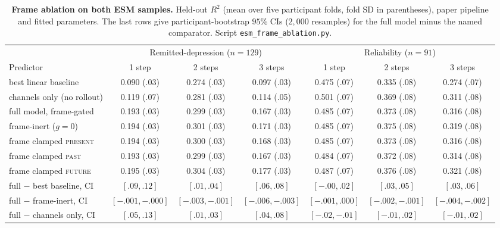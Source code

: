 \documentclass[11pt,a4paper]{article}
\begin{document}
\begin{table}[htbp]
\centering\small
\caption{\textbf{Frame ablation on both ESM samples.} Held-out $R^2$ (mean over five
participant folds, fold SD in parentheses), paper pipeline and fitted parameters. The
last rows give participant-bootstrap $95\%$ CIs ($2{,}000$ resamples) for the full
model minus the named comparator. Script \texttt{esm\_frame\_ablation.py}.}
\label{tab:frameablation}
\begin{tabular}{lcccccc}
\toprule
& \multicolumn{3}{c}{Remitted-depression ($n{=}129$)} & \multicolumn{3}{c}{Reliability ($n{=}91$)} \\
Predictor & 1 step & 2 steps & 3 steps & 1 step & 2 steps & 3 steps \\
\midrule
best linear baseline & 0.090 (.03) & 0.274 (.03) & 0.097 (.03) & 0.475 (.07) & 0.335 (.08) & 0.274 (.07) \\
channels only (no rollout) & 0.119 (.07) & 0.281 (.03) & 0.114 (.05) & 0.501 (.07) & 0.369 (.08) & 0.311 (.08) \\
full model, frame-gated & 0.193 (.03) & 0.299 (.03) & 0.167 (.03) & 0.485 (.07) & 0.373 (.08) & 0.316 (.08) \\
frame-inert ($g=0$) & 0.194 (.03) & 0.301 (.03) & 0.171 (.03) & 0.485 (.07) & 0.375 (.08) & 0.319 (.08) \\
frame clamped \textsc{present} & 0.194 (.03) & 0.300 (.03) & 0.168 (.03) & 0.485 (.07) & 0.373 (.08) & 0.316 (.08) \\
frame clamped \textsc{past} & 0.193 (.03) & 0.299 (.03) & 0.167 (.03) & 0.484 (.07) & 0.372 (.08) & 0.314 (.08) \\
frame clamped \textsc{future} & 0.195 (.03) & 0.304 (.03) & 0.177 (.03) & 0.487 (.07) & 0.376 (.08) & 0.321 (.08) \\
\midrule
full $-$ best baseline, CI & $[.09,.12]$ & $[.01,.04]$ & $[.06,.08]$ & $[-.00,.02]$ & $[.03,.05]$ & $[.03,.06]$ \\
full $-$ frame-inert, CI & $[-.001,-.000]$ & $[-.003,-.001]$ & $[-.006,-.003]$ & $[-.001,.000]$ & $[-.002,-.001]$ & $[-.004,-.002]$ \\
full $-$ channels only, CI & $[.05,.13]$ & $[.01,.03]$ & $[.04,.08]$ & $[-.02,-.01]$ & $[-.01,.02]$ & $[-.01,.02]$ \\
\bottomrule
\end{tabular}
\end{table}
\end{document}
